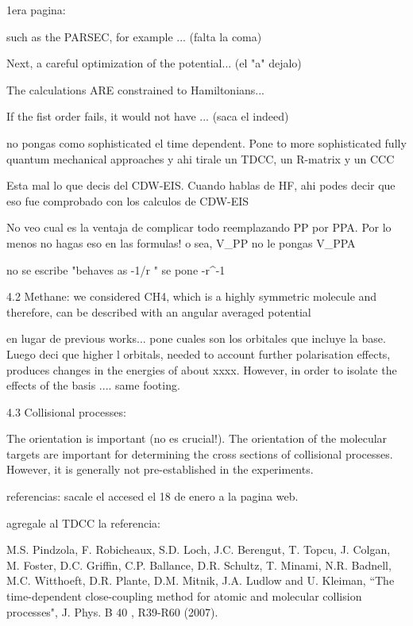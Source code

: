 1era pagina:

such as the PARSEC, for example ... (falta la coma)

Next, a careful optimization of the potential... (el "a" dejalo)

The calculations ARE constrained to Hamiltonians...

If the fist order fails, it would not have ... (saca el indeed)

no pongas como sophisticated el time dependent.
Pone to more sophisticated fully quantum mechanical approaches
y ahi tirale un TDCC, un R-matrix y un CCC

Esta mal lo que decis del CDW-EIS.
Cuando hablas de HF, ahi podes decir que eso fue comprobado con
los calculos de CDW-EIS

No veo cual es la ventaja de complicar todo reemplazando PP por PPA.
Por lo menos no hagas eso en las formulas! o sea, V_PP no le pongas V_PPA

no se escribe "behaves as -1/r " se pone -r^-1


4.2 Methane: we considered CH4, which is a highly symmetric molecule and
therefore, can be described with an angular averaged potential

en lugar de previous works... pone cuales son los orbitales que incluye la
base. Luego deci que higher l orbitals, needed to account further polarisation
effects, produces changes in the energies of about xxxx. However, in order
to isolate the effects of the basis .... same footing.


4.3 Collisional processes:

The orientation is important (no es crucial!).
The orientation of the molecular targets are important for determining  the cross
sections of collisional processes. However, it is generally not  pre-established
in the experiments.

referencias:
sacale el accesed el 18 de enero a la pagina web.

agregale al TDCC la referencia:

M.S. Pindzola, F. Robicheaux, S.D. Loch, J.C. Berengut, T. Topcu, J.  Colgan, M. Foster, D.C. Griffin, C.P. Ballance, D.R. Schultz, T.  Minami, N.R. Badnell, M.C. Witthoeft, D.R. Plante, D.M. Mitnik, J.A.  Ludlow and U. Kleiman, ``The time-dependent close-coupling method for  atomic and molecular collision processes", J. Phys. B 40 , R39-R60  (2007).




